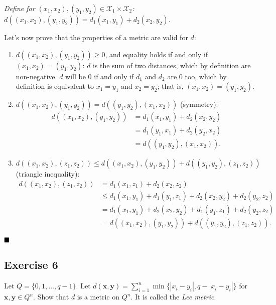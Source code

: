 \textit{Define for $(x_1, x_2), (y_1, y_2) \in \mathcal{X}_1\times\mathcal{X}_2$: $d((x_1, x_2), (y_1, y_2)) = d_1(x_1, y_1) + d_2(x_2, y_2)$.}

Let's now prove that the properties of a metric are valid for $d$:

\begin{enumerate}[label=\alph*)]
	\item $d((x_1, x_2), (y_1, y_2))\geq0$, and equality holds if and only if $(x_1, x_2) = (y_1, y_2)$: $d$ is the sum of two distances, which by definition are non-negative. $d$ will be $0$ if and only if $d_1$ and $d_2$ are $0$ too, which by definition is equivalent to $x_1 = y_1$ and $x_2 = y_2$; that is, $(x_1, x_2) = (y_1, y_2)$.
	
	\item $d((x_1, x_2), (y_1, y_2)) = d((y_1, y_2), (x_1, x_2))$ (symmetry):
	\begin{align*}
		d((x_1, x_2), (y_1, y_2)) &= d_1(x_1, y_1) + d_2(x_2, y_2) \\
		&= d_1(y_1, x_1) + d_2(y_2, x_2) \\
		&= d((y_1, y_2), (x_1, x_2)).
	\end{align*}

	\item $d((x_1, x_2), (z_1, z_2)) \leq d((x_1, x_2), (y_1, y_2)) + d((y_1, y_2), (z_1, z_2))$ (triangle inequality):
	\begin{align*}
		d((x_1, x_2), (z_1, z_2)) &= d_1(x_1, z_1) + d_2(x_2, z_2) \\
		&\leq d_1(x_1, y_1) + d_1(y_1, z_1) + d_2(x_2, y_2) + d_2(y_2, z_2) \\
		&= d_1(x_1, y_1) + d_2(x_2, y_2) + d_1(y_1, z_1) + d_2(y_2, z_2) \\
		&= d((x_1, x_2), (y_1, y_2)) + d((y_1, y_2), (z_1, z_2)).
	\end{align*}
\end{enumerate}

$\qed$

\subsection{Exercise 6}

\begin{formulationBox}
	Let $Q = \{0, 1, \hdots, q-1\}$. Let $d(\textbf{x}, \textbf{y}) = \sum_{i=1}^n \min\{|x_i-y_i|, q - |x_i - y_i|\}$ for $\textbf{x}, \textbf{y} \in Q^n$. Show that $d$ is a metric on $Q^n$. It is called the \textit{Lee metric}.
\end{formulationBox}

